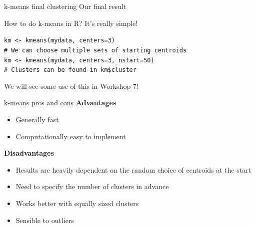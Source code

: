 \documentclass[9pt]{beamer}
\begin{document}
\begin{frame}
{k-means final clustering}
Our final result

\end{frame}

\begin{frame}
{How to do k-means in R?}
It's really simple!

\begin{codebox}
\texttt{km <- kmeans(mydata, centers=3)}\\
\texttt{\# We can choose multiple sets of starting centroids}\\
\texttt{km <- kmeans(mydata, centers=3, nstart=50)}\\
\texttt{\# Clusters can be found in km\$cluster}
\end{codebox}

We will see some use of this in Workshop 7!
\end{frame}

\begin{frame}
{k-means pros and cons}
\textbf{Advantages}
\begin{itemize}
\item Generally fast
\item Computationally easy to implement
\end{itemize}

\textbf{Disadvantages}
\begin{itemize}
\item Results are heavily dependent on the random choice of centroids at the start
\item Need to specify the number of clusters in advance
\item Works better with equally sized clusters
\item Sensible to outliers

\end{itemize}
\end{frame}
\end{document}
